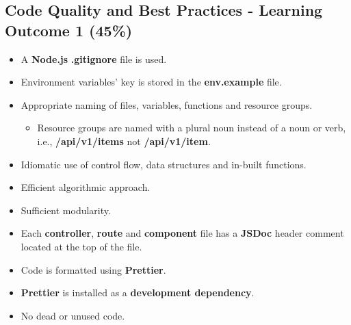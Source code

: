 \documentclass{article}
\begin{document}
\subsection*{Code Quality and Best Practices - Learning Outcome 1 (45\%)}
\begin{itemize}
	\item A \textbf{Node.js} \textbf{.gitignore} file is used.
	\item Environment variables' key is stored in the \textbf{env.example} file. 
  	\item Appropriate naming of files, variables, functions and resource groups.
  \begin{itemize}
	\item Resource groups are named with a plural noun instead of a noun or verb, i.e., \textbf{/api/v1/items} not \textbf{/api/v1/item}.
  \end{itemize}
	\item Idiomatic use of control flow, data structures and in-built functions.
  \item Efficient algorithmic approach.
  \item Sufficient modularity.
  \item Each \textbf{controller}, \textbf{route} and \textbf{component} file has a \textbf{JSDoc} header comment located at the top of the file.
  \item Code is formatted using \textbf{Prettier}.
  \item \textbf{Prettier} is installed as a \textbf{development dependency}.	
\item No dead or unused code. 
\end{itemize}
\end{document}
